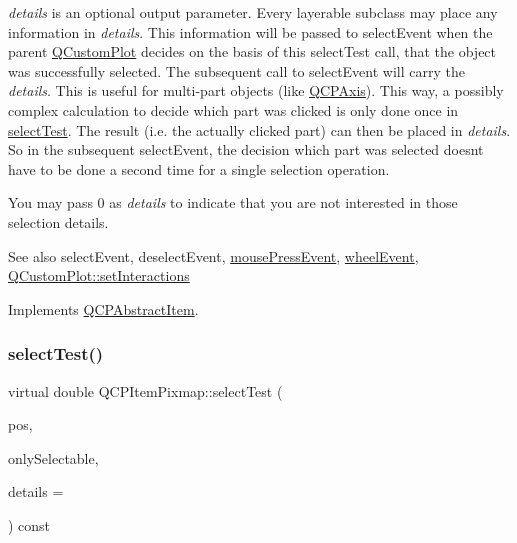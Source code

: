 {\itshape details} is an optional output parameter. Every layerable subclass may place any information in {\itshape details}. This information will be passed to select\+Event when the parent \hyperlink{class_q_custom_plot}{Q\+Custom\+Plot} decides on the basis of this select\+Test call, that the object was successfully selected. The subsequent call to select\+Event will carry the {\itshape details}. This is useful for multi-\/part objects (like \hyperlink{class_q_c_p_axis}{Q\+C\+P\+Axis}). This way, a possibly complex calculation to decide which part was clicked is only done once in \hyperlink{class_q_c_p_item_pixmap_a65d1ede7bb479b90d40186d083071947}{select\+Test}. The result (i.\+e. the actually clicked part) can then be placed in {\itshape details}. So in the subsequent select\+Event, the decision which part was selected doesn\textquotesingle{}t have to be done a second time for a single selection operation.

You may pass 0 as {\itshape details} to indicate that you are not interested in those selection details.

\begin{DoxySeeAlso}{See also}
select\+Event, deselect\+Event, \hyperlink{class_q_c_p_layerable_af6567604818db90f4fd52822f8bc8376}{mouse\+Press\+Event}, \hyperlink{class_q_c_p_layerable_a47dfd7b8fd99c08ca54e09c362b6f022}{wheel\+Event}, \hyperlink{class_q_custom_plot_a5ee1e2f6ae27419deca53e75907c27e5}{Q\+Custom\+Plot\+::set\+Interactions} 
\end{DoxySeeAlso}


Implements \hyperlink{class_q_c_p_abstract_item_ae41d0349d68bb802c49104afd100ba2a}{Q\+C\+P\+Abstract\+Item}.

\mbox{\label{class_q_c_p_item_pixmap_aa2919a96737ed02f643fe138fb830712}} 
\subsubsection{\texorpdfstring{select\+Test()}{selectTest()}\hspace{0.1cm}{\footnotesize\ttfamily [2/2]}}
{\footnotesize\ttfamily virtual double Q\+C\+P\+Item\+Pixmap\+::select\+Test (\begin{DoxyParamCaption}\item[{const Q\+PointF \&}]{pos,  }\item[{bool}]{only\+Selectable,  }\item[{Q\+Variant $\ast$}]{details = {} }\end{DoxyParamCaption}) const\hspace{0.3cm}{\ttfamily [virtual]}}

